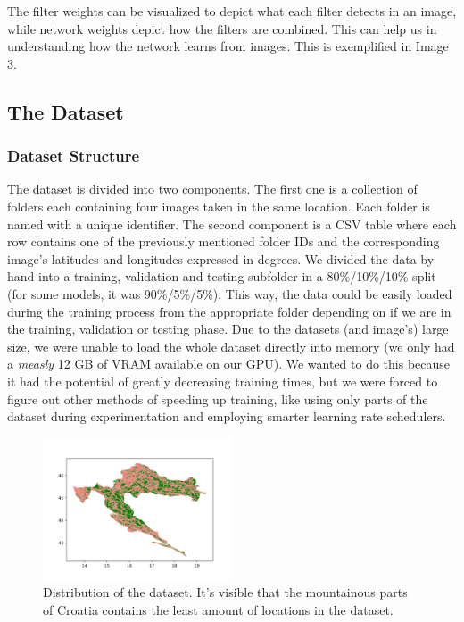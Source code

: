 \documentclass[]{article}
\begin{document}
The filter weights can be visualized to depict what each filter detects
in an image, while network weights depict how the filters are combined.
This can help us in understanding how the network learns from images.
This is exemplified in Image 3.

\hypertarget{the-dataset}{%
\subsection{The Dataset}\label{the-dataset}}

\hypertarget{dataset-structure}{%
\subsubsection{Dataset Structure}\label{dataset-structure}}

The dataset is divided into two components. The first one is a
collection of folders each containing four images taken in the same
location. Each folder is named with a unique identifier. The second
component is a CSV table where each row contains one of the previously
mentioned folder IDs and the corresponding image's latitudes and
longitudes expressed in degrees. We divided the data by hand into a
training, validation and testing subfolder in a 80\%/10\%/10\% split
(for some models, it was 90\%/5\%/5\%). This way, the data could be
easily loaded during the training process from the appropriate folder
depending on if we are in the training, validation or testing phase. Due
to the datasets (and image's) large size, we were unable to load the
whole dataset directly into memory (we only had a \emph{measly} 12 GB of
VRAM available on our GPU). We wanted to do this because it had the
potential of greatly decreasing training times, but we were forced to
figure out other methods of speeding up training, like using only parts
of the dataset during experimentation and employing smarter learning
rate schedulers.

\begin{figure}
\centering
\includegraphics[width=0.5\textwidth,height=\textheight]{./tex2pdf.-3ffa51a14b505aec/853f6b22ecc69e0bad475f4ec7b087779bf2571a.png}
\caption{Distribution of the dataset. It's visible that the mountainous
parts of Croatia contains the least amount of locations in the dataset.}
\end{figure}
\end{document}
